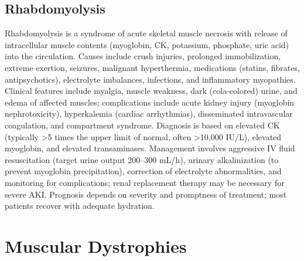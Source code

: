 \subsection{Rhabdomyolysis}
\label{sec:Rhabdomyolysis}
Rhabdomyolysis is a syndrome of acute skeletal muscle necrosis with release of intracellular muscle contents (myoglobin, CK, potassium, phosphate, uric acid) into the circulation. Causes include crush injuries, prolonged immobilization, extreme exertion, seizures, malignant hyperthermia, medications (statins, fibrates, antipsychotics), electrolyte imbalances, infections, and inflammatory myopathies. Clinical features include myalgia, muscle weakness, dark (cola-colored) urine, and edema of affected muscles; complications include acute kidney injury (myoglobin nephrotoxicity), hyperkalemia (cardiac arrhythmias), disseminated intravascular coagulation, and compartment syndrome. Diagnosis is based on elevated CK (typically >5 times the upper limit of normal, often >10,000 IU/L), elevated myoglobin, and elevated transaminases. Management involves aggressive IV fluid resuscitation (target urine output 200--300 mL/h), urinary alkalinization (to prevent myoglobin precipitation), correction of electrolyte abnormalities, and monitoring for complications; renal replacement therapy may be necessary for severe AKI. Prognosis depends on severity and promptness of treatment; most patients recover with adequate hydration.

\section{Muscular Dystrophies}








\label{sec:Muscular Dystrophies}

